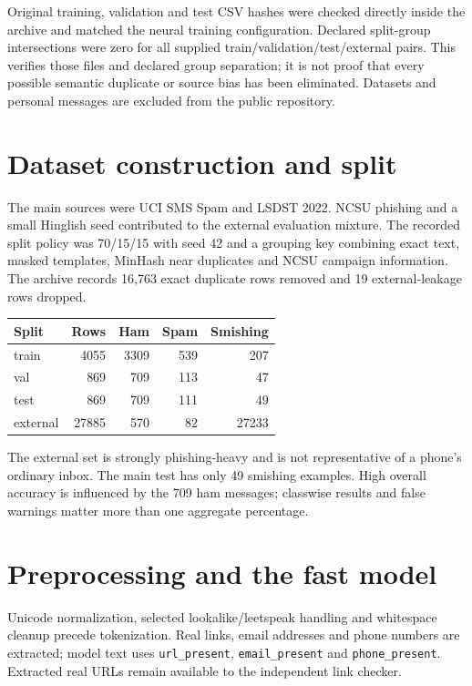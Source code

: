 \documentclass[11pt,a4paper,oneside]{report}
\newcommand{\code}[1]{\nolinkurl{#1}}
\begin{document}
Original training, validation and test CSV hashes were checked directly inside the archive and matched the neural training configuration. Declared split-group intersections were zero for all supplied train/validation/test/external pairs. This verifies those files and declared group separation; it is not proof that every possible semantic duplicate or source bias has been eliminated. Datasets and personal messages are excluded from the public repository.

\section{Dataset construction and split}
The main sources were UCI SMS Spam and LSDST 2022. NCSU phishing and a small Hinglish seed contributed to the external evaluation mixture. The recorded split policy was 70/15/15 with seed 42 and a grouping key combining exact text, masked templates, MinHash near duplicates and NCSU campaign information. The archive records 16,763 exact duplicate rows removed and 19 external-leakage rows dropped.


{\small
\begin{longtable}{@{}lrrrr@{}}
\toprule
Split & Rows & Ham & Spam & Smishing\\\midrule\endhead
train & 4055 & 3309 & 539 & 207\\
val & 869 & 709 & 113 & 47\\
test & 869 & 709 & 111 & 49\\
external & 27885 & 570 & 82 & 27233\\
\bottomrule\end{longtable}
}


The external set is strongly phishing-heavy and is not representative of a phone's ordinary inbox. The main test has only 49 smishing examples. High overall accuracy is influenced by the 709 ham messages; classwise results and false warnings matter more than one aggregate percentage.

\section{Preprocessing and the fast model}
Unicode normalization, selected lookalike/leetspeak handling and whitespace cleanup precede tokenization. Real links, email addresses and phone numbers are extracted; model text uses \code{url_present}, \code{email_present} and \code{phone_present}. Extracted real URLs remain available to the independent link checker.
\end{document}
